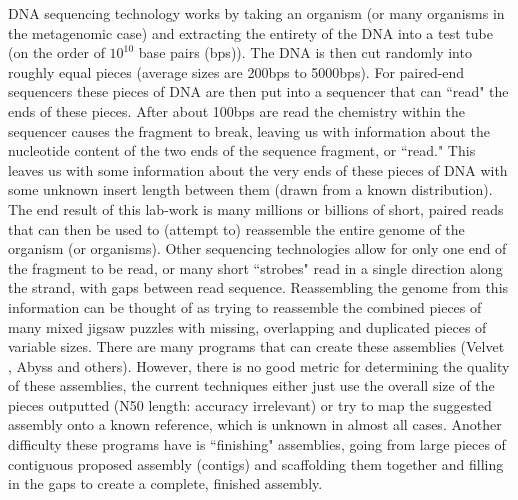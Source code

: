 \documentclass[phd,tocprelim]{cornell}
\begin{document}
DNA sequencing technology works by taking an organism (or many organisms in the metagenomic
case) and extracting the entirety of the DNA into a test tube (on the order of $10^{10}$ base pairs (bps)).
The DNA is then cut randomly into roughly equal pieces (average sizes are 200bps to 5000bps). For paired-end sequencers these pieces
of DNA are then put into a sequencer that can ``read" the ends of these pieces. After about 100bps are read the chemistry within the sequencer causes the fragment to break, leaving us with information about the nucleotide content of the two ends of the sequence fragment, or ``read." This leaves us with some information about the very ends of these pieces of DNA with some
unknown insert length between them (drawn from a known distribution). The end result of this
lab-work is many millions or billions of short, paired reads that can then be used to (attempt to)
reassemble the entire genome of the organism (or organisms). Other sequencing technologies allow for only one end of the fragment to be read, or many short ``strobes" read in a single direction along the strand, with gaps between read sequence. Reassembling the genome from this information can be thought of as trying to
reassemble the combined pieces of many mixed jigsaw puzzles with missing, overlapping and duplicated pieces of variable
sizes. There are many programs that can create these assemblies (Velvet \cite{Zerbino2008}, Abyss \cite{Simpson2009} and others). However, there
is no good metric for determining the quality of these assemblies, the current techniques either just
use the overall size of the pieces outputted (N50 length: accuracy irrelevant) or try to map the suggested
assembly onto a known reference, which is unknown in almost all cases. Another difficulty these 
programs have is ``finishing" assemblies, going from large pieces of contiguous proposed assembly
(contigs) and scaffolding them together and filling in the gaps to create a complete, finished
assembly.
\end{document}
